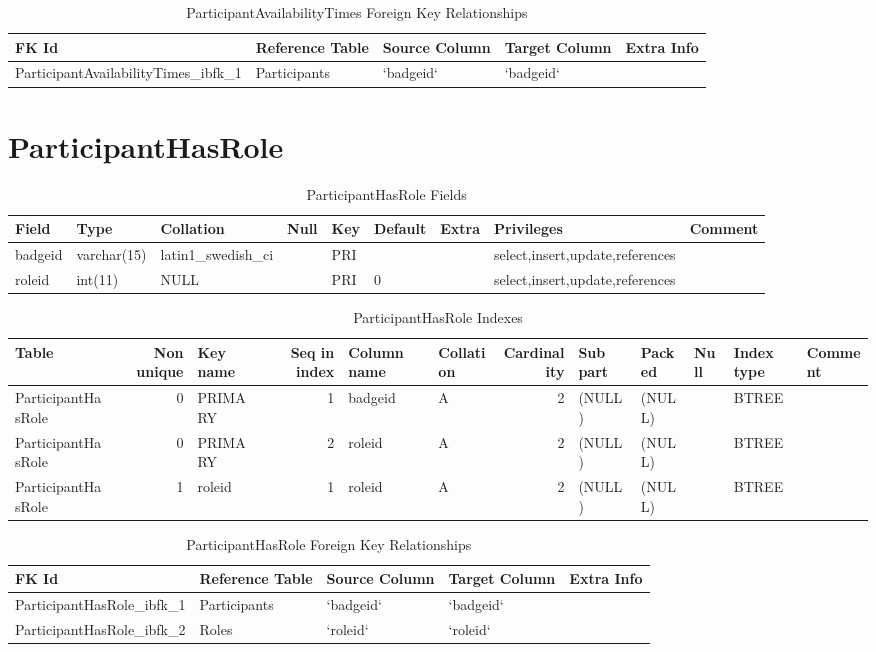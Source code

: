 \documentclass[captions=tablesignature]{scrartcl}
\begin{document}
\begin{table}[htb]
\caption{\label{tbl:participantavailabilitytimesfkr}ParticipantAvailabilityTimes Foreign Key Relationships}
\centering
\begin{tabular}{lllll}
\hline
FK Id & Reference Table & Source Column & Target Column & Extra Info\\
\hline
ParticipantAvailabilityTimes\_ibfk\_1 & Participants & `badgeid` & `badgeid` & \\
\hline
\end{tabular}
\end{table}
\section{ParticipantHasRole}
\label{sec-7}

\begin{table}[htb]
\caption{\label{tbl:participanthasrolefields}ParticipantHasRole Fields}
\centering
\begin{tabular}{lllllllll}
\hline
Field & Type & Collation & Null & Key & Default & Extra & Privileges & Comment\\
\hline
badgeid & varchar(15) & latin1\_swedish\_ci &  & PRI &  &  & select,insert,update,references & \\
roleid & int(11) & NULL &  & PRI & 0 &  & select,insert,update,references & \\
\hline
\end{tabular}
\end{table}

\begin{table}[htb]
\caption{\label{tbl:participanthasroleindexes}ParticipantHasRole Indexes}
\centering
\begin{tabular}{lrlrllrlllll}
\hline
Table & Non unique & Key name & Seq in index & Column name & Collation & Cardinality & Sub part & Packed & Null & Index type & Comment\\
\hline
ParticipantHasRole & 0 & PRIMARY & 1 & badgeid & A & 2 & (NULL) & (NULL) &  & BTREE & \\
ParticipantHasRole & 0 & PRIMARY & 2 & roleid & A & 2 & (NULL) & (NULL) &  & BTREE & \\
ParticipantHasRole & 1 & roleid & 1 & roleid & A & 2 & (NULL) & (NULL) &  & BTREE & \\
\hline
\end{tabular}
\end{table}

\begin{table}[htb]
\caption{\label{tbl:participanthasrolefkr}ParticipantHasRole Foreign Key Relationships}
\centering
\begin{tabular}{lllll}
\hline
FK Id & Reference Table & Source Column & Target Column & Extra Info\\
\hline
ParticipantHasRole\_ibfk\_1 & Participants & `badgeid` & `badgeid` & \\
ParticipantHasRole\_ibfk\_2 & Roles & `roleid` & `roleid` & \\
\hline
\end{tabular}
\end{table}
\end{document}
